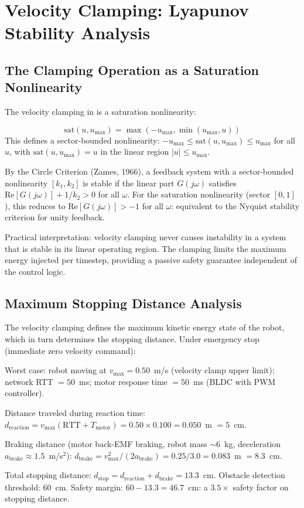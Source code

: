 \section{Velocity Clamping: Lyapunov Stability Analysis}

\subsection{The Clamping Operation as a Saturation Nonlinearity}

The velocity clamping in  is a saturation nonlinearity:

\begin{eqblock}
\begin{equation}
\text{sat}(u, u_{\max}) = \max(-u_{\max}, \min(u_{\max}, u))
\end{equation}
This defines a sector-bounded nonlinearity: $-u_{\max}\leq\text{sat}(u,u_{\max})\leq u_{\max}$ for all $u$, with $\text{sat}(u,u_{\max})=u$ in the linear region $|u|\leq u_{\max}$.

By the Circle Criterion (Zames, 1966), a feedback system with a sector-bounded nonlinearity $[k_1,k_2]$ is stable if the linear part $G(j\omega)$ satisfies $\text{Re}[G(j\omega)] + 1/k_2 > 0$ for all $\omega$. For the saturation nonlinearity (sector $[0,1]$), this reduces to $\text{Re}[G(j\omega)]>-1$ for all $\omega$: equivalent to the Nyquist stability criterion for unity feedback.
\end{eqblock}

Practical interpretation: velocity clamping never causes instability in a system that is stable in its linear operating region. The clamping limits the maximum energy injected per timestep, providing a passive safety guarantee independent of the control logic.

\subsection{Maximum Stopping Distance Analysis}

The velocity clamping defines the maximum kinetic energy state of the robot, which in turn determines the stopping distance. Under emergency stop (immediate zero velocity command):

\begin{eqblock}
Worst case: robot moving at $v_{\max}=0.50$~m/s (velocity clamp upper limit); network RTT $=50$~ms; motor response time $=50$~ms (BLDC with PWM controller).

Distance traveled during reaction time: $d_{\text{reaction}} = v_{\max}(\text{RTT}+T_{\text{motor}}) = 0.50\times0.100 = 0.050$~m $=5$~cm.

Braking distance (motor back-EMF braking, robot mass $\sim$6~kg, deceleration $a_{\text{brake}}\approx1.5$~m/s$^2$): $d_{\text{brake}} = v_{\max}^2/(2a_{\text{brake}}) = 0.25/3.0 = 0.083$~m $=8.3$~cm.

Total stopping distance: $d_{\text{stop}} = d_{\text{reaction}} + d_{\text{brake}} = 13.3$~cm. Obstacle detection threshold: 60~cm. Safety margin: $60-13.3=46.7$~cm: a $3.5\times$ safety factor on stopping distance.
\end{eqblock}

